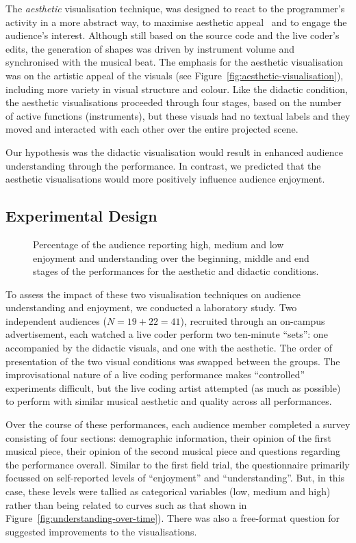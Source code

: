 \documentclass{sig-alternate}
\begin{document}
The \emph{aesthetic} visualisation technique, was designed to react to
the programmer's activity in a more abstract way, to maximise
aesthetic appeal~\cite{Cawthon2007} and to engage the audience's
interest. Although still based on the source code and the live coder's
edits, the generation of shapes was driven by instrument volume and
synchronised with the musical beat. The emphasis for the aesthetic
visualisation was on the artistic appeal of the visuals (see
Figure~\ref{fig:aesthetic-visualisation}), including more variety in
visual structure and colour. Like the didactic condition, the
aesthetic visualisations proceeded through four stages, based on the
number of active functions (instruments), but these visuals had no
textual labels and they moved and interacted with each other over the
entire projected scene.

Our hypothesis was the didactic visualisation would result in enhanced
audience understanding through the performance. In contrast, we
predicted that the aesthetic visualisations would more positively
influence audience enjoyment.

\subsection{Experimental Design}

\begin{figure*}
\centering
{}
\caption{Percentage of the audience reporting high, medium and low
enjoyment and understanding over the beginning, middle and end stages
of the performances for the aesthetic and didactic conditions.}
\label{fig:enjoyment-understanding}
\end{figure*}

To assess the impact of these two visualisation techniques on audience
understanding and enjoyment, we conducted a laboratory study. Two
independent audiences ($N=19+22=41$), recruited through an on-campus
advertisement, each watched a live coder perform two ten-minute
``sets'': one accompanied by the didactic visuals, and one with the
aesthetic. The order of presentation of the two visual conditions was
swapped between the groups. The improvisational nature of a live
coding performance makes ``controlled'' experiments difficult, but the
live coding artist attempted (as much as possible) to perform with
similar musical aesthetic and quality across all performances.

Over the course of these performances, each audience member completed
a survey consisting of four sections: demographic information, their
opinion of the first musical piece, their opinion of the second
musical piece and questions regarding the performance overall. Similar
to the first field trial, the questionnaire primarily focussed on
self-reported levels of ``enjoyment'' and ``understanding''. But, in
this case, these levels were tallied as categorical variables (low,
medium and high) rather than being related to curves such as that
shown in Figure~\ref{fig:understanding-over-time}). There was also a
free-format question for suggested improvements to the visualisations.
\end{document}
